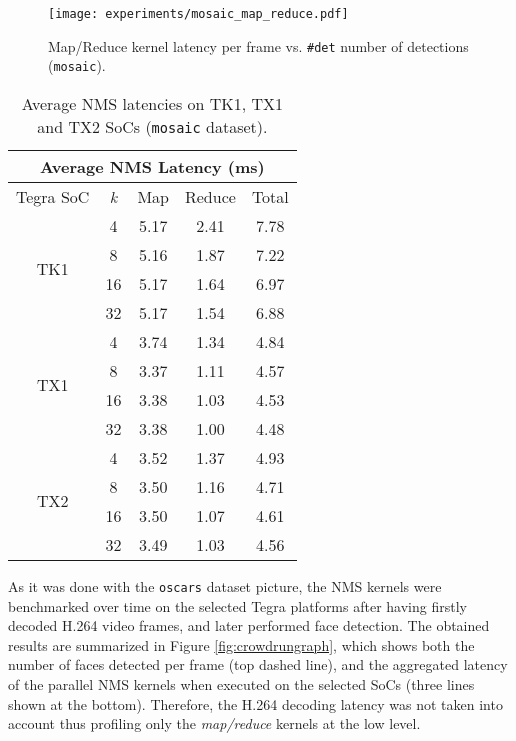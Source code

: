 \begin{figure}[t]
  \centering
  \texttt{[image: experiments/mosaic\_map\_reduce.pdf]}
  \caption{\label{fig:mosaicmapreduce} Map/Reduce kernel latency per frame vs. \texttt{\#det} number of detections (\texttt{mosaic}).}
\end{figure} 

 \begin{table}
  \renewcommand{\arraystretch}{1.3}
  \caption{Average NMS latencies on TK1, TX1 and TX2 SoCs (\texttt{mosaic} dataset).}
  \centering
  \footnotesize
  \begin{tabular}{| c | c | c | c | c |}
  \hline
  \multicolumn{5}{|c|}{\textbf{Average NMS Latency (ms)}} \\
  \hline
    Tegra SoC & \emph{k} & Map & Reduce & Total \\
  \hline
    \multirow{4}{*}{TK1} & 4  & 5.17 & 2.41 & 7.78 \\
                         & 8  & 5.16 & 1.87 & 7.22 \\
                         & 16 & 5.17 & 1.64 & 6.97 \\
                         & 32 & 5.17 & 1.54 & 6.88 \\
  \hline
    \multirow{4}{*}{TX1} & 4  & 3.74 & 1.34 & 4.84 \\
                         & 8  & 3.37 & 1.11 & 4.57 \\
                         & 16 & 3.38 & 1.03 & 4.53 \\
                         & 32 & 3.38 & 1.00 & 4.48 \\
  \hline
    \multirow{4}{*}{TX2} & 4  & 3.52 & 1.37 & 4.93 \\
                         & 8  & 3.50 & 1.16 & 4.71 \\
                         & 16 & 3.50 & 1.07 & 4.61 \\
                         & 32 & 3.49 & 1.03 & 4.56 \\
  \hline
  \end{tabular}
  \normalsize
  \label{tab:nmsmosaicmean}
 \end{table}

As it was done with the \texttt{oscars} dataset picture, the NMS kernels were benchmarked over time on the selected Tegra platforms 
after having firstly decoded H.264 video frames, and later performed face detection. The obtained results are summarized in Figure \ref{fig:crowdrungraph}, 
which shows both the number of faces detected per frame (top dashed line), and the aggregated latency of the parallel NMS kernels when 
executed on the selected SoCs (three lines shown at the bottom). Therefore, the H.264 decoding latency was not taken into account thus 
profiling only the \emph{map/reduce} kernels at the low level.

